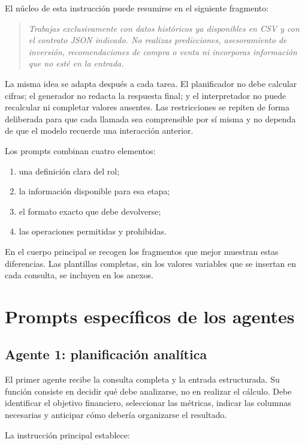 El núcleo de esta instrucción puede resumirse en el siguiente fragmento:

\begin{quote}
\small
\textit{Trabajas exclusivamente con datos históricos ya disponibles en CSV y con el contrato JSON indicado. No realizas predicciones, asesoramiento de inversión, recomendaciones de compra o venta ni incorporas información que no esté en la entrada.}
\end{quote}

La misma idea se adapta después a cada tarea. El planificador no debe calcular cifras; el generador no redacta la respuesta final; y el interpretador no puede recalcular ni completar valores ausentes. Las restricciones se repiten de forma deliberada para que cada llamada sea comprensible por sí misma y no dependa de que el modelo recuerde una interacción anterior.

Los prompts combinan cuatro elementos:

\begin{enumerate}
    \item una definición clara del rol;
    \item la información disponible para esa etapa;
    \item el formato exacto que debe devolverse;
    \item las operaciones permitidas y prohibidas.
\end{enumerate}

En el cuerpo principal se recogen los fragmentos que mejor muestran estas diferencias. Las plantillas completas, sin los valores variables que se insertan en cada consulta, se incluyen en los anexos.

\section{Prompts específicos de los agentes}

\subsection{Agente 1: planificación analítica}

El primer agente recibe la consulta completa y la entrada estructurada. Su función consiste en decidir qué debe analizarse, no en realizar el cálculo. Debe identificar el objetivo financiero, seleccionar las métricas, indicar las columnas necesarias y anticipar cómo debería organizarse el resultado.

La instrucción principal establece:

